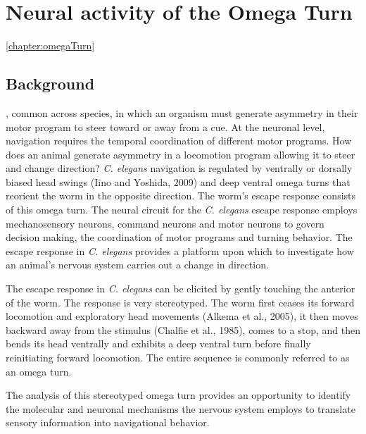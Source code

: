 
\begin{comment}
	Points to make here:
	Navigatoin is worthy of study
	Omega turn is a critical part of navigation
	
\end{comment}

\chapter{Neural activity of the Omega Turn}\ref{chapter:omegaTurn}

\section{Background}

, common across species, in which an organism must generate asymmetry in their motor program to steer toward or away from a cue.  At the neuronal level, navigation requires the temporal coordination of different motor programs.  How does an animal generate asymmetry in a locomotion program allowing it to steer and change direction?  \textit{C. elegans} navigation is regulated by ventrally or dorsally biased head swings (Iino and Yoshida, 2009) and deep ventral omega turns that reorient the worm in the opposite direction.  The worm's escape response consists of this omega turn. The neural circuit for the \textit{C. elegans} escape response employs mechanosensory neurons, command neurons and motor neurons to govern decision making, the coordination of motor programs and turning behavior. The escape response in \textit{C. elegans} provides a platform upon which to investigate how an animal's nervous system carries out a change in direction.  




The escape response in \textit{C. elegans} can be elicited by gently touching the anterior of the worm. The response is very stereotyped. The worm first ceases its forward locomotion and exploratory head movements (Alkema et al., 2005), it then moves backward away from the stimulus (Chalfie et al., 1985), comes to a stop, and then bends its head ventrally and  exhibits a deep ventral turn before finally reinitiating forward locomotion.  The entire sequence is commonly referred to as an omega turn. 

The analysis of this stereotyped omega turn provides an opportunity to identify the molecular and neuronal mechanisms  the nervous system employs to translate sensory information into navigational behavior.  



